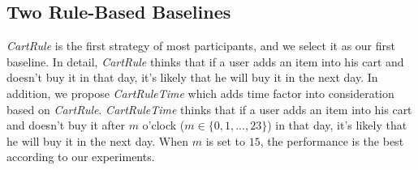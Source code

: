 \documentclass{llncs}
\begin{document}

\subsection{Two Rule-Based Baselines}
\emph{CartRule} is the first strategy of most participants, and we select it as our first baseline.
In detail, \emph{CartRule} thinks that if a user adds an item into his cart and doesn't buy it in that day,
it's likely that he will buy it in the next day.
In addition, we propose \emph{CartRuleTime} which adds time factor into consideration based on \emph{CartRule}.
\emph{CartRuleTime} thinks that if a user adds an item into his cart and doesn't buy it
after $m$ o'clock ($ m \in \{ 0, 1, ..., 23 \} $) in that day,
it's likely that he will buy it in the next day.
When $m$ is set to $15$, the performance is the best according to our experiments.


\end{document}
